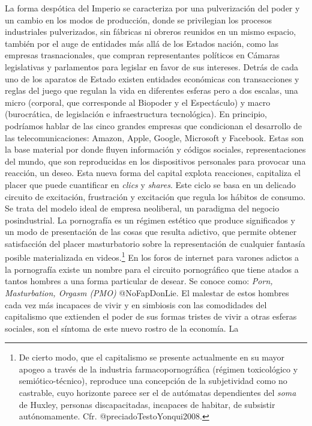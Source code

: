 \documentclass[
]{article}
\begin{document}
La forma despótica del Imperio se caracteriza por una pulverización del
poder y un cambio en los modos de producción, donde se privilegian los
procesos industriales pulverizados, sin fábricas ni obreros reunidos en
un mismo espacio, también por el auge de entidades más allá de los
Estados nación, como las empresas trasnacionales, que compran
representantes políticos en Cámaras legislativas y parlamentos para
legislar en favor de sus intereses. Detrás de cada uno de los aparatos
de Estado existen entidades económicas con transacciones y reglas del
juego que regulan la vida en diferentes esferas pero a dos escalas, una
micro (corporal, que corresponde al Biopoder y el Espectáculo) y macro
(burocrática, de legislación e infraestructura tecnológica). En
principio, podríamos hablar de las cinco grandes empresas que
condicionan el desarrollo de las telecomunicaciones: Amazon, Apple,
Google, Microsoft y Facebook. Estas son la base material por donde
fluyen información y códigos sociales, representaciones del mundo, que
son reproducidas en los dispositivos personales para provocar una
reacción, un deseo. Esta nueva forma del capital explota reacciones,
capitaliza el placer que puede cuantificar en \emph{clics} y
\emph{shares}. Este ciclo se basa en un delicado circuito de excitación,
frustración y excitación que regula los hábitos de consumo. Se trata del
modelo ideal de empresa neoliberal, un paradigma del negocio
posindustrial. La pornografía es un régimen estético que produce
significados y un modo de presentación de las cosas que resulta
adictivo, que permite obtener satisfacción del placer masturbatorio
sobre la representación de cualquier fantasía posible materializada en
videos.\footnote{De cierto modo, que el capitalismo se presente
  actualmente en su mayor apogeo a través de la industria
  farmacopornográfica (régimen toxicológico y semiótico-técnico),
  reproduce una concepción de la subjetividad como no castrable, cuyo
  horizonte parece ser el de autómatas dependientes del \emph{soma} de
  Huxley, personas discapacitadas, incapaces de habitar, de subsistir
  autónomamente. Cfr. @preciadoTestoYonqui2008.} En los foros de
internet para varones adictos a la pornografía existe un nombre para el
circuito pornográfico que tiene atados a tantos hombres a una forma
particular de desear. Se conoce como: \emph{Porn, Masturbation, Orgasm
(PMO)} @NoFapDonLie. El malestar de estos hombres cada vez más incapaces
de vivir y en simbiosis con las comodidades del capitalismo que
extienden el poder de sus formas tristes de vivir a otras esferas
sociales, son el síntoma de este nuevo rostro de la economía. La
\end{document}
